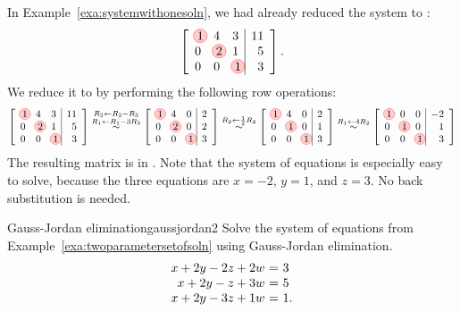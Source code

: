 \begin{solution}
  In Example~\ref{exa:systemwithonesoln}, we had already reduced the
  system to {\ef}:
  \begin{equation*}
    \leftB
    \begin{array}{rrr|r}
      \circled{1} & 4 & 3 & 11 \\
      0 & \circled{2} & 1 & 5 \\
      0 & 0 & \circled{1} & 3
    \end{array}
    \rightB.
  \end{equation*}
  We reduce it to {\rref} by performing the following row operations:
  \begin{equation*}
    \leftB
    \begin{array}{rrr|r}
      \circled{1} & 4 & 3 & 11 \\
      0 & \circled{2} & 1 & 5 \\
      0 & 0 & \circled{1} & 3
    \end{array}
    \rightB
    \stackrel{R_2\leftarrow R_2-R_3}{\stackrel{R_1\leftarrow R_1-3R_3}{\sim}}
    \leftB
    \begin{array}{rrr|r}
      \circled{1} & 4 & 0 & 2 \\
      0 & \circled{2} & 0 & 2 \\
      0 & 0 & \circled{1} & 3
    \end{array}
    \rightB
    \stackrel{R_2\leftarrow \frac{1}{2}R_2}{\sim}
    \leftB
    \begin{array}{rrr|r}
      \circled{1} & 4 & 0 & 2 \\
      0 & \circled{1} & 0 & 1 \\
      0 & 0 & \circled{1} & 3
    \end{array}
    \rightB
    \stackrel{R_1\leftarrow 4R_2}{\sim}
    \leftB
    \begin{array}{rrr|r}
      \circled{1} & 0 & 0 & -2 \\
      0 & \circled{1} & 0 & 1 \\
      0 & 0 & \circled{1} & 3
    \end{array}
    \rightB
  \end{equation*}
  The resulting matrix is in {\rref}. Note that the system of
  equations is especially easy to solve, because the three equations
  are $x=-2$, $y=1$, and $z=3$. No back substitution is needed.
\end{solution}

\begin{example}{Gauss-Jordan elimination}{gaussjordan2}
  Solve the system of equations from
  Example~\ref{exa:twoparametersetofsoln} using Gauss-Jordan
  elimination.
  \begin{equation*}
    \begin{array}{r@{~}c@{~}l}
      x +2y  -2z  +2w &=& 3 \\
      x +2y  -z   +3w &=& 5 \\
      x +2y  -3z  +1w &=& 1.
    \end{array}
  \end{equation*}    
\end{example}

